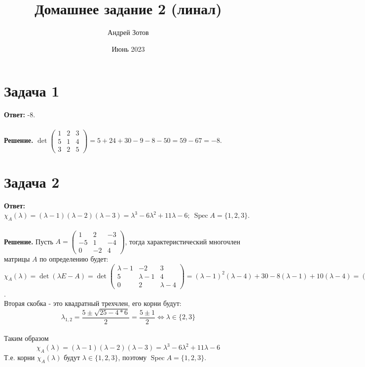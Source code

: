 \documentclass{article}
\title{Домашнее задание 2 (линал)}
\author{Андрей Зотов}
\date{Июнь 2023}
\DeclareMathOperator{\Spec}{Spec}
\begin{document}
\maketitle

\section*{Задача 1}
{\bf Ответ:} -8.
\\
\\
{\bf Решение.} $\det \left(\begin{array}{rrr}1 & 2 & 3\\5 & 1 & 4\\3 & 2 & 5\end{array}\right)=5 + 24 + 30 - 9 - 8 - 50 = 59 - 67 = -8$.
\section*{Задача 2}
{\bf Ответ:} $\chi_A(\lambda) = (\lambda-1)(\lambda-2)(\lambda-3) = \lambda^3-6\lambda^2+11\lambda-6;\ \Spec A=\{1, 2, 3\}$.
\\
\\
{\bf Решение.} Пусть $A =\left(\begin{array}{rrr}1 & 2 & -3\\-5 & 1 & -4\\0 & -2 & 4\end{array}\right)$, тогда  характеристический многочлен матрицы $A$ по определению будет: $\chi_A(\lambda)=\det(\lambda E - A) = \det\left(\begin{array}{ccc}\lambda-1 & -2 & 3\\5 & \lambda-1 & 4\\0 & 2 & \lambda-4\end{array}\right)=(\lambda-1)^2(\lambda-4)+30-8(\lambda-1)+10(\lambda-4)=(\lambda-1)^2(\lambda-4)+30-8(\lambda-1)+10(\lambda-1)-30 = (\lambda-1)((\lambda-1)(\lambda-4)+2)=(\lambda-1)(\lambda^2-5\lambda+6)$.
\\
Вторая скобка - это квадратный трехчлен, его корни будут:
$$\lambda_{1,2}=\frac{5\pm\sqrt{25-4*6}}{2}=\frac{5\pm 1}{2} \Leftrightarrow \lambda \in \{2, 3\}$$
\\
Таким образом
$$\chi_A(\lambda) = (\lambda-1)(\lambda-2)(\lambda-3) = \lambda^3-6\lambda^2+11\lambda-6$$
Т.е. корни $\chi_A(\lambda)$ будут $\lambda \in \{1, 2, 3\}$, поэтому $\Spec A = \{1, 2, 3\}$.
\\
\end{document}
